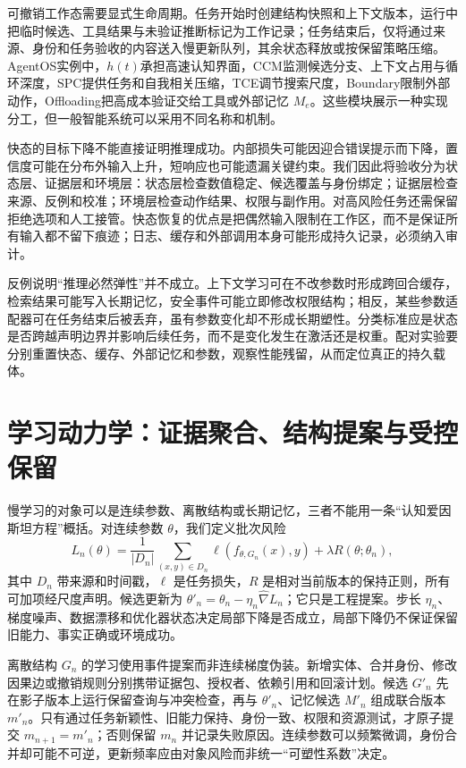 可撤销工作态需要显式生命周期。任务开始时创建结构快照和上下文版本，运行中把临时候选、工具结果与未验证推断标记为工作记录；任务结束后，仅将通过来源、身份和任务验收的内容送入慢更新队列，其余状态释放或按保留策略压缩。AgentOS实例中，$h(t)$承担高速认知界面，CCM监测候选分支、上下文占用与循环深度，SPC提供任务和自我相关压缩，TCE调节搜索尺度，Boundary限制外部动作，Offloading把高成本验证交给工具或外部记忆 $M_e$。这些模块展示一种实现分工，但一般智能系统可以采用不同名称和机制。

快态的目标下降不能直接证明推理成功。内部损失可能因迎合错误提示而下降，置信度可能在分布外输入上升，短响应也可能遗漏关键约束。我们因此将验收分为状态层、证据层和环境层：状态层检查数值稳定、候选覆盖与身份绑定；证据层检查来源、反例和校准；环境层检查动作结果、权限与副作用。对高风险任务还需保留拒绝选项和人工接管。快态恢复的优点是把偶然输入限制在工作区，而不是保证所有输入都不留下痕迹；日志、缓存和外部调用本身可能形成持久记录，必须纳入审计。

反例说明“推理必然弹性”并不成立。上下文学习可在不改参数时形成跨回合缓存，检索结果可能写入长期记忆，安全事件可能立即修改权限结构；相反，某些参数适配器可在任务结束后被丢弃，虽有参数变化却不形成长期塑性。分类标准应是状态是否跨越声明边界并影响后续任务，而不是变化发生在激活还是权重。配对实验要分别重置快态、缓存、外部记忆和参数，观察性能残留，从而定位真正的持久载体。

\section{学习动力学：证据聚合、结构提案与受控保留}
\label{sec:section_4157}

慢学习的对象可以是连续参数、离散结构或长期记忆，三者不能用一条“认知爱因斯坦方程”概括。对连续参数 $\theta$，我们定义批次风险
\[
L_n(\theta)=\frac{1}{|D_n|}\sum_{(x,y)\in D_n}\ell(f_{\theta,G_n}(x),y)+\lambda R(\theta;\theta_n),
\]
其中 $D_n$ 带来源和时间戳，$\ell$ 是任务损失，$R$ 是相对当前版本的保持正则，所有可加项经尺度声明。候选更新为 $\theta'_n=\theta_n-\eta_n\widehat\nabla L_n$；它只是工程提案。步长 $\eta_n$、梯度噪声、数据漂移和优化器状态决定局部下降是否成立，局部下降仍不保证保留旧能力、事实正确或环境成功。

离散结构 $G_n$ 的学习使用事件提案而非连续梯度伪装。新增实体、合并身份、修改因果边或撤销规则分别携带证据包、授权者、依赖引用和回滚计划。候选 $G'_n$ 先在影子版本上运行保留查询与冲突检查，再与 $\theta'_n$、记忆候选 $M'_n$ 组成联合版本 $m'_n$。只有通过任务新颖性、旧能力保持、身份一致、权限和资源测试，才原子提交 $m_{n+1}=m'_n$；否则保留 $m_n$ 并记录失败原因。连续参数可以频繁微调，身份合并却可能不可逆，更新频率应由对象风险而非统一“可塑性系数”决定。

